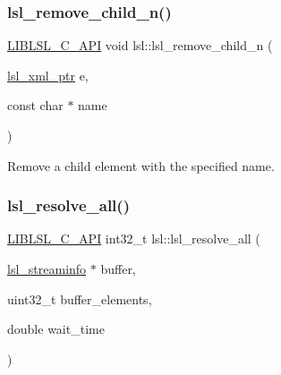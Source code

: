 \subsubsection{\texorpdfstring{lsl\+\_\+remove\+\_\+child\+\_\+n()}{lsl\_remove\_child\_n()}}
{\footnotesize\ttfamily \hyperlink{lsl__cpp_8h_aafd0ef1813e8be84a1420c4f1df64615}{L\+I\+B\+L\+S\+L\+\_\+\+C\+\_\+\+A\+PI} void lsl\+::lsl\+\_\+remove\+\_\+child\+\_\+n (\begin{DoxyParamCaption}\item[{\hyperlink{namespacelsl_a5edc7a49a1a1be1634fe6dce3d59c59b}{lsl\+\_\+xml\+\_\+ptr}}]{e,  }\item[{const char $\ast$}]{name }\end{DoxyParamCaption})}

Remove a child element with the specified name. \mbox{\label{namespacelsl_a075ab08464c90d97b8f081d89ea889f2}} 
\subsubsection{\texorpdfstring{lsl\+\_\+resolve\+\_\+all()}{lsl\_resolve\_all()}}
{\footnotesize\ttfamily \hyperlink{lsl__cpp_8h_aafd0ef1813e8be84a1420c4f1df64615}{L\+I\+B\+L\+S\+L\+\_\+\+C\+\_\+\+A\+PI} int32\+\_\+t lsl\+::lsl\+\_\+resolve\+\_\+all (\begin{DoxyParamCaption}\item[{\hyperlink{namespacelsl_aa0a9ce9956061679949daa2e35aae2e8}{lsl\+\_\+streaminfo} $\ast$}]{buffer,  }\item[{uint32\+\_\+t}]{buffer\+\_\+elements,  }\item[{double}]{wait\+\_\+time }\end{DoxyParamCaption})}

